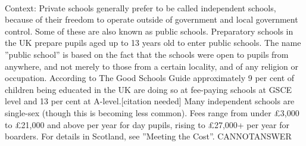 \documentclass[11pt,a4paper, onecolumn]{article}
\begin{document}
\\ Context: Private schools generally prefer to be called independent schools, because of their freedom to operate outside of government and local government control. Some of these are also known as public schools. Preparatory schools in the UK prepare pupils aged up to 13 years old to enter public schools. The name ''public school'' is based on the fact that the schools were open to pupils from anywhere, and not merely to those from a certain locality, and of any religion or occupation. According to The Good Schools Guide approximately 9 per cent of children being educated in the UK are doing so at fee-paying schools at GSCE level and 13 per cent at A-level.[citation needed] Many independent schools are single-sex (though this is becoming less common). Fees range from under £3,000 to £21,000 and above per year for day pupils, rising to £27,000+ per year for boarders. For details in Scotland, see ''Meeting the Cost''. CANNOTANSWER
\end{document}
